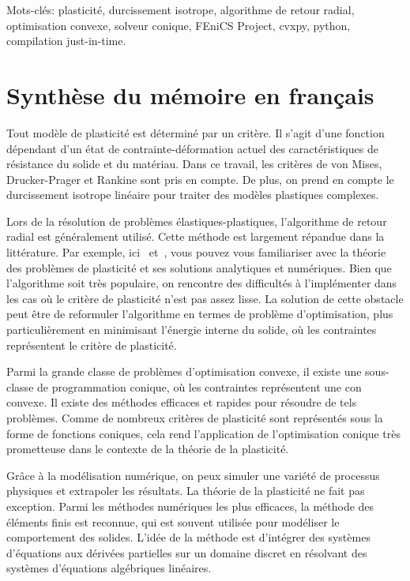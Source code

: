 \documentclass[12pt]{article}
\begin{document}
Mots-clés: plasticité, durcissement isotrope, algorithme de retour radial, optimisation convexe, solveur conique, FEniCS Project, cvxpy, python, compilation just-in-time.

\newpage
\section*{\centering Synthèse du mémoire en français}
Tout modèle de plasticité est déterminé par un critère. Il s'agit d'une fonction dépendant d'un état de contrainte-déformation actuel des caractéristiques de résistance du solide et du matériau. Dans ce travail, les critères de von Mises, Drucker-Prager et Rankine sont pris en compte. De plus, on prend en compte le durcissement isotrope linéaire pour traiter des modèles plastiques complexes.

Lors de la résolution de problèmes élastiques-plastiques, l'algorithme de retour radial est généralement utilisé. Cette méthode est largement répandue dans la littérature. Par exemple, ici~\parencite{bonnet:hal-01083772} et~\parencite{nonlinear_FEM2012}, vous pouvez vous familiariser avec la théorie des problèmes de plasticité et ses solutions analytiques et numériques. Bien que l'algorithme soit très populaire, on rencontre des difficultés à l'implémenter dans les cas où le critère de plasticité n'est pas assez lisse. La solution de cette obstacle peut être de reformuler l'algorithme en termes de problème d'optimisation, plus particulièrement en minimisant l'énergie interne du solide, où les contraintes représentent le critère de plasticité.


Parmi la grande classe de problèmes d'optimisation convexe, il existe une sous-classe de programmation conique, où les contraintes représentent une con convexe. Il existe des méthodes efficaces et rapides pour résoudre de tels problèmes. Comme de nombreux critères de plasticité sont représentés sous la forme de fonctions coniques, cela rend l'application de l'optimisation conique très prometteuse dans le contexte de la théorie de la plasticité.

Grâce à la modélisation numérique, on peux simuler une variété de processus physiques et extrapoler les résultats. La théorie de la plasticité ne fait pas exception. Parmi les méthodes numériques les plus efficaces, la méthode des éléments finis est reconnue, qui est souvent utilisée pour modéliser le comportement des solides. L'idée de la méthode est d'intégrer des systèmes d'équations aux dérivées partielles sur un domaine discret en résolvant des systèmes d'équations algébriques linéaires. 
\end{document}
